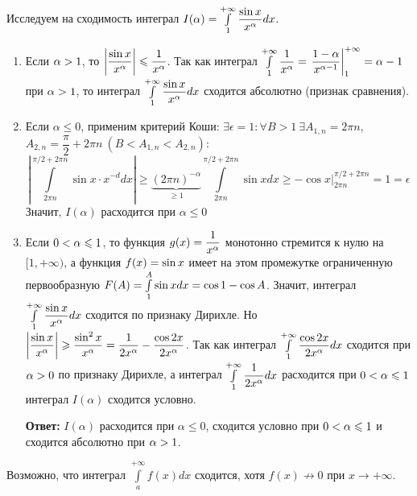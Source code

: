 \documentclass[a4paper,10pt]{article}
\begin{document}
	\begin{exmp}
		Исследуем на сходимость интеграл $I(\alpha)\hm{=} \intl^{+ \infty}_1
		 \dfrac{\sin x}{x^{\alpha}} dx$. %
		 \begin{enumerate}[label=\arabic*)]
		 	\item Если $\alpha \hm{>} 1$, то $\left| \dfrac{\sin x}{x^{\alpha}} \right| \hm{\le}
		 	 \dfrac{1}{x^{\alpha}}$. Так как интеграл $\intl^{+ \infty}_1
		 	 \dfrac{1}{x^{\alpha}} \hm{=} \left.\dfrac{1 - \alpha}{x^{\alpha - 1}}\right|^{+ \infty}_1
		 	 \hm{=} \alpha - 1$ при $\alpha \hm{>} 1$, то интеграл $\mathop{\int}\limits^{+ \infty}_1
		 	 \dfrac{\sin x}{x^{\alpha}} dx$ сходится абсолютно (признак сравнения).
		 	\item Если $\alpha\le0$, применим критерий Коши: $\exists \epsilon=1:\forall B>1~ \exists A_{1,n}=2\pi n$, $A_{2,n}=\dfrac{\pi}{2}+2\pi n~ (B<A_{1,n}<A_{2,n}):$
		 	$$\left|\int\limits_{2\pi n}^{\pi/2+2\pi n}\sin x\cdot x^{-d}dx\right|\ge\underbrace{(2\pi n)^{-\alpha}}_{\ge1}\int\limits_{2\pi n}^{\pi/2+2\pi n}\sin xdx\ge-\cos x\bigg|_{2\pi n}^{\pi/2+2\pi n}=1=\epsilon$$
		 	Значит, $I(\alpha)$ расходится при $\alpha\le0$ 
		 	\item Если $0 \hm{<} \alpha \hm{\le} 1$, то функция $g(x) \hm{=} \dfrac{1}{x^{\alpha}}$ монотонно стремится
		 	 к нулю на $[1, + \infty)$, а функция $f(x) \hm{=} \sin x$ имеет на этом промежутке
		 	 ограниченную первообразную $F(A) \hm{=} \intl^A_1 \sin x dx \hm{=} \cos 1 - \cos A$.
		 	 Значит, интеграл $\mathop{\int}\limits^{+ \infty}_1 \dfrac{\sin x}{x^{\alpha}} dx$ сходится по признаку
		 	 Дирихле. Но $\left| \dfrac{\sin x}{x^{\alpha}} \right| \hm{\ge} \dfrac{\sin^2 x}{x^{\alpha}} \hm{=}
		 	 \dfrac{1}{2x^{\alpha}} - \dfrac{\cos 2x}{2x^{\alpha}}$. Так как интеграл
		 	 $\mathop{\int}\limits^{+ \infty}_{1} \dfrac{\cos 2x}{2x^{\alpha}} dx$ сходится при $\alpha \hm{>} 0$ по
		 	 признаку Дирихле, а интеграл $\mathop{\int}\limits^{+ \infty}_1 \dfrac{1}{2x^{\alpha}} dx$ расходится
		 	 при $0 \hm{<} \alpha \hm{\le} 1$ интеграл $I(\alpha)$ сходится условно.
		 	 \par \textbf{Ответ:} $I(\alpha)$ расходится при $\alpha\le0$, сходится условно при
		 	 $0 \hm{<} \alpha \hm{\le} 1$ и сходится абсолютно при $\alpha \hm{>} 1$. \par
		 \end{enumerate}
	\end{exmp}

	\begin{note}
		Возможно, что интеграл $\int\limits_a^{+\infty}f(x)dx$ сходится, хотя $f(x)\not\to0$ при $x\to+\infty$.
	\end{note}
\end{document}
